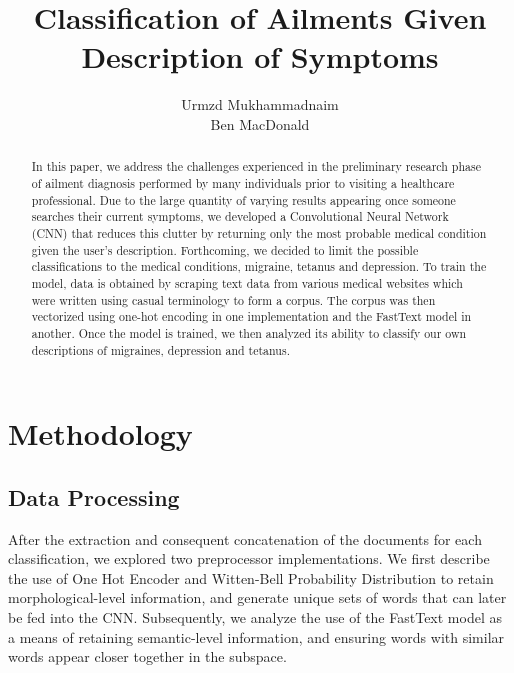 \documentclass[12pt]{report}
\title{Classification of Ailments Given Description of Symptoms}
\author{Urmzd Mukhammadnaim \\ Ben MacDonald}
\begin{document}
\maketitle
\tableofcontents
\begin{abstract}
In this paper, we address the challenges experienced in the preliminary research phase
of ailment diagnosis performed by many individuals prior to visiting a
healthcare professional. Due to the large quantity of varying results appearing
once someone searches their current symptoms, we developed a Convolutional
Neural Network (CNN) that reduces this clutter by returning only the most
probable medical condition given the user’s description. Forthcoming, we
decided to limit the possible classifications to the medical conditions,
migraine, tetanus and depression. To train the model, data is obtained by
scraping text data from various medical websites which were written using
casual terminology to form a corpus. The corpus was then vectorized using
one-hot encoding in one implementation and the FastText model in another. Once
the model is trained, we then analyzed its ability to classify our own
descriptions of migraines, depression and tetanus. 
\end{abstract}

\chapter{Methodology} 
\section{Data Processing}

After the extraction and consequent concatenation of the documents for each
classification, we explored two preprocessor implementations. We first describe
the use of One Hot Encoder and Witten-Bell Probability Distribution to retain
morphological-level information, and generate unique sets of words that can
later be fed into the CNN. Subsequently, we analyze the use of the FastText
model as a means of retaining semantic-level information, and ensuring words
with similar words appear closer together in the subspace.
\end{document}

